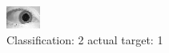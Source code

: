 \begin{figure}[h!]
\begin{center}
\includegraphics[width=0.60\columnwidth]{figures/ID1571_class_2_target_1.png}
\end{center}
\caption{ Classification: 2 actual target: 1}
\label{fig:ID1571_class_2_target_1}
\end{figure}
